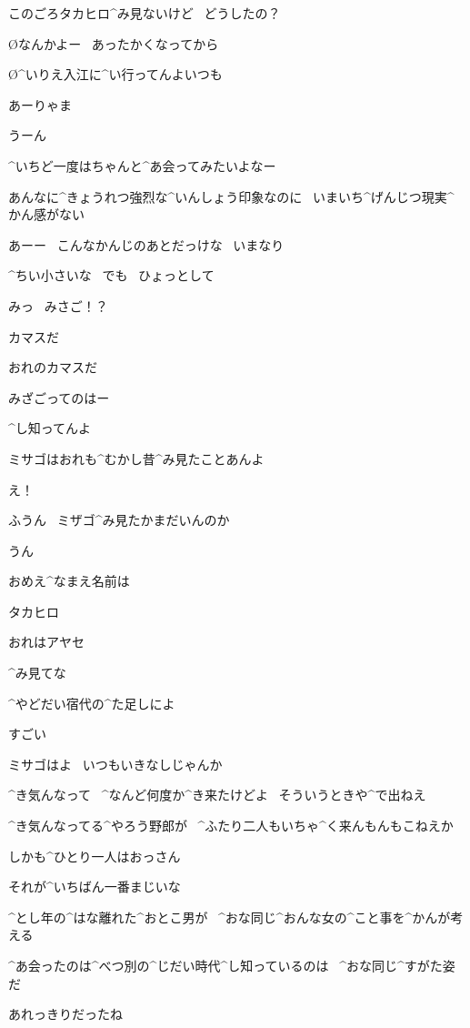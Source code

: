 \page[36]
\A このごろタカヒロ^{み}{見}ないけど
\ どうしたの？

\O なんかよー
\ あったかくなってから

\O ^{いりえ}{入江}に^{い}{行}ってんよいつも

\A あーりゃま

\page
\T うーん

\T ^{いちど}{一度}はちゃんと^{あ}{会}ってみたいよなー

\page
\T あんなに^{きょうれつ}{強烈}な^{いんしょう}{印象}なのに
\ いまいち^{げんじつ}{現実}^{かん}{感}がない

\T あーー
\ こんなかんじのあとだっけな
\ いまなり

\page
\T ^{ちい}{小}さいな
\ でも
\ ひょっとして

\T みっ
\ みさご！？

\page
\Y カマスだ

\Y おれのカマスだ

\T みざごってのはー

\Y ^{し}{知}ってんよ

\Y ミサゴはおれも^{むかし}{昔}^{み}{見}たことあんよ

\T え！

\page
\Y ふうん
\ ミザゴ^{み}{見}たかまだいんのか

\T うん

\Y おめえ^{なまえ}{名前}は

\T タカヒロ

\Y おれはアヤセ

\Y ^{み}{見}てな

\page[44]
\Y ^{やどだい}{宿代}の^{た}{足}しによ

\T すごい

\Y ミサゴはよ
\ いつもいきなしじゃんか

\page
\Y ^{き}{気}んなって
\ ^{なんど}{何度}か^{き}{来}たけどよ
\ そういうときや^{で}{出}ねえ

\Y ^{き}{気}んなってる^{やろう}{野郎}が
\ ^{ふたり}{二人}もいちゃ^{く}{来}んもんもこねえか

\T しかも^{ひとり}{一人}はおっさん

\Y それが^{いちばん}{一番}まじいな

\N ^{とし}{年}の^{はな}{離}れた^{おとこ}{男}が
\ ^{おな}{同}じ^{おんな}{女}の^{こと}{事}を^{かんが}{考}える

\N ^{あ}{会}ったのは^{べつ}{別}の^{じだい}{時代}^{し}{知}っているのは
\ ^{おな}{同}じ^{すがた}{姿}だ

\page[48]
\Y あれっきりだったね

